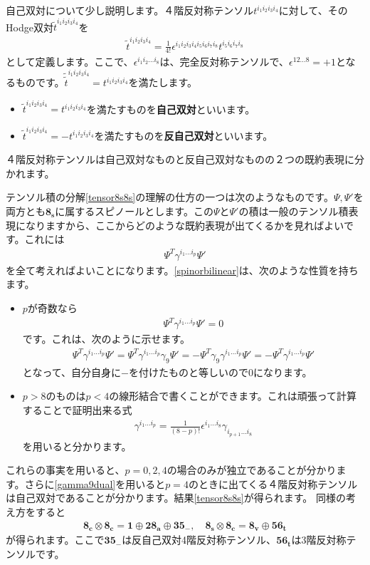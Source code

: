 \documentclass[report,paper=a4, fontsize=12pt, line_length=16cm, number_of_lines=33,dvipdfmx]{jlreq}
\numberwithin{equation}{chapter}
\numberwithin{equation}{section}
\newcommand{\kyou}[1]{{\sffamily \bfseries #1}}
\newcommand{\triv}{\mathbf{1}}
\newcommand{\etv}{\mathbf{8_v}}
\newcommand{\ets}{\mathbf{8_s}}
\newcommand{\etc}{\mathbf{8_c}}
\newcommand{\tweta}{\mathbf{28_{a}}}
\newcommand{\thfvm}{\mathbf{35}_{-}}
\newcommand{\fsxt}{\mathbf{56_t}}
\begin{document}
自己双対について少し説明します。４階反対称テンソル$t^{i_1i_2i_3i_4}$に対して、そのHodge双対$\tilde{t}^{i_1i_2i_3i_4}$を
\begin{align}
  \tilde{t}^{i_1i_2i_3i_4}=\frac{1}{4!}\epsilon^{i_1i_2i_3i_4i_5i_6i_7i_8}t^{i_5i_6i_7i_8}
\end{align}
として定義します。ここで、$\epsilon^{i_1i_2\dots i_8}$は、完全反対称テンソルで、$\epsilon^{12\dots 8}=+1$となるものです。$\tilde{\tilde{t}}^{i_1i_2i_3i_4}=t^{i_1i_2i_3i_4}$を満たします。
\begin{itemize}
  \item $\tilde{t}^{i_1i_2i_3i_4}=t^{i_1i_2i_3i_4}$を満たすものを\kyou{自己双対}といいます。
  \item $\tilde{t}^{i_1i_2i_3i_4}=-t^{i_1i_2i_3i_4}$を満たすものを\kyou{反自己双対}といいます。
\end{itemize}
４階反対称テンソルは自己双対なものと反自己双対なものの２つの既約表現に分かれます。

テンソル積の分解\eqref{tensor8s8s}の理解の仕方の一つは次のようなものです。$\Psi,\Psi'$を両方とも$\ets$に属するスピノールとします。この$\Psi$と$\Psi'$の積は一般のテンソル積表現になりますから、ここからどのような既約表現が出てくるかを見ればよいです。これには
\begin{align}
  \Psi^{T}\gamma^{i_1\dots i_p}\Psi'
  \label{spinorbilinear}
\end{align}
を全て考えればよいことになります。\eqref{spinorbilinear}は、次のような性質を持ちます。
\begin{itemize}
  \item $p$が奇数なら
  \begin{align}
    \Psi^{T}\gamma^{i_1\dots i_p}\Psi'=0
  \end{align}
  です。これは、次のように示せます。
  \begin{align}
    \Psi^{T}\gamma^{i_1\dots i_p}\Psi'=
    \Psi^{T}\gamma^{i_1\dots i_p}\gamma_9\Psi'=
    -\Psi^{T}\gamma_9\gamma^{i_1\dots i_p}\Psi'=
    -\Psi^{T}\gamma^{i_1\dots i_p}\Psi'
  \end{align}
  となって、自分自身に$-$を付けたものと等しいので$0$になります。
  \item $p>8$のものは$p<4$の線形結合で書くことができます。これは頑張って計算することで証明出来る式
  \begin{align}
    \gamma^{i_1\dots i_p}=\frac{1}{(8-p)!}\epsilon^{i_1\dots i_8}\gamma_{i_{p+1}\dots i_8}\label{gamma9dual}
  \end{align}
  を用いると分かります。
\end{itemize}
これらの事実を用いると、$p=0,2,4$の場合のみが独立であることが分かります。さらに\eqref{gamma9dual}を用いると$p=4$のときに出てくる４階反対称テンソルは自己双対であることが分かります。結果\eqref{tensor8s8s}が得られます。
同様の考え方をすると
\begin{align}
  \etc\otimes\etc=\triv \oplus \tweta \oplus \thfvm,\quad
  \ets\otimes\etc=\etv \oplus \fsxt
\end{align}
が得られます。ここで$\thfvm$は反自己双対4階反対称テンソル、$\fsxt$は3階反対称テンソルです。
\end{document}
